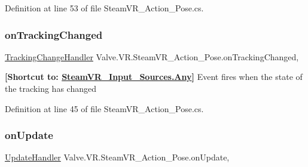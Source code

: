 Definition at line 53 of file Steam\+V\+R\+\_\+\+Action\+\_\+\+Pose.\+cs.

\mbox{\label{class_valve_1_1_v_r_1_1_steam_v_r___action___pose_a995b370f9b9a08c25a934eb2beb2c5cd}} 
\subsubsection{\texorpdfstring{onTrackingChanged}{onTrackingChanged}}
{\footnotesize\ttfamily \mbox{\hyperlink{class_valve_1_1_v_r_1_1_steam_v_r___action___pose_a52e352705659c14685cf8a88ef4bafd6}{Tracking\+Change\+Handler}} Valve.\+V\+R.\+Steam\+V\+R\+\_\+\+Action\+\_\+\+Pose.\+on\+Tracking\+Changed\hspace{0.3cm}{\ttfamily [add]}, {\ttfamily [remove]}}



{\bfseries{\mbox{[}Shortcut to\+: \mbox{\hyperlink{namespace_valve_1_1_v_r_a82e5bf501cc3aa155444ee3f0662853faed36a1ef76a59ee3f15180e0441188ad}{Steam\+V\+R\+\_\+\+Input\+\_\+\+Sources.\+Any}}\mbox{]}}} Event fires when the state of the tracking has changed 



Definition at line 45 of file Steam\+V\+R\+\_\+\+Action\+\_\+\+Pose.\+cs.

\mbox{\label{class_valve_1_1_v_r_1_1_steam_v_r___action___pose_a3a642708b4ec292d5d30e701eac7c41d}} 
\subsubsection{\texorpdfstring{onUpdate}{onUpdate}}
{\footnotesize\ttfamily \mbox{\hyperlink{class_valve_1_1_v_r_1_1_steam_v_r___action___pose_a243e7046a430c572e5be3d1b6b322b6d}{Update\+Handler}} Valve.\+V\+R.\+Steam\+V\+R\+\_\+\+Action\+\_\+\+Pose.\+on\+Update\hspace{0.3cm}{\ttfamily [add]}, {\ttfamily [remove]}}



